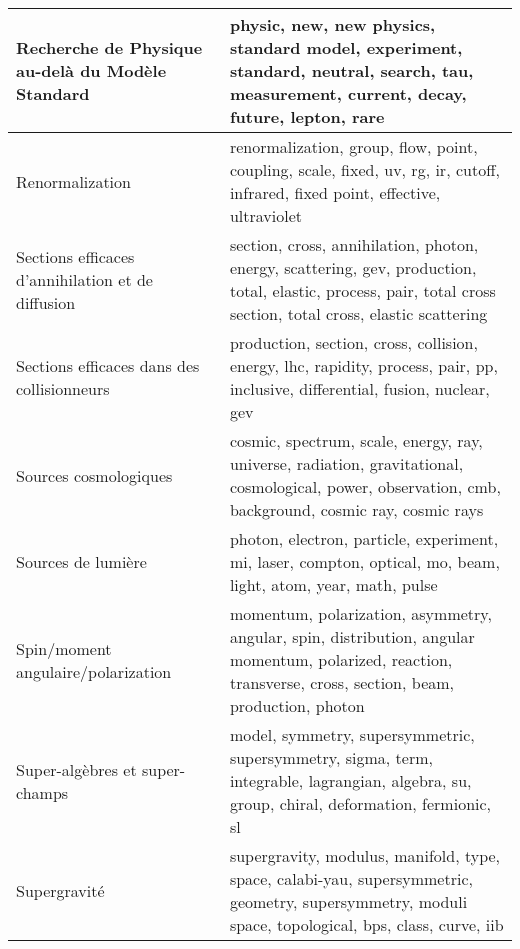 \begin{longtable}[H]{p{}|p{}}
Recherche de Physique au-delà du Modèle Standard                &                                                                    physic, new, new physics, standard model, experiment, standard, neutral, search, tau, measurement, current, decay, future, lepton, rare \\ \midrule
Renormalization                                                 &                                                                             renormalization, group, flow, point, coupling, scale, fixed, uv, rg, ir, cutoff, infrared, fixed point, effective, ultraviolet \\ \midrule
Sections efficaces d'annihilation et de diffusion               &                                             section, cross, annihilation, photon, energy, scattering, gev, production, total, elastic, process, pair, total cross section, total cross, elastic scattering \\ \midrule
Sections efficaces dans des collisionneurs                      &                                                                             production, section, cross, collision, energy, lhc, rapidity, process, pair, pp, inclusive, differential, fusion, nuclear, gev \\ \midrule
Sources cosmologiques                                           &                                                       cosmic, spectrum, scale, energy, ray, universe, radiation, gravitational, cosmological, power, observation, cmb, background, cosmic ray, cosmic rays \\ \midrule
Sources de lumière                                              &                                                                                              photon, electron, particle, experiment, mi, laser, compton, optical, mo, beam, light, atom, year, math, pulse \\ \midrule
Spin/moment angulaire/polarization                              &                                                momentum, polarization, asymmetry, angular, spin, distribution, angular momentum, polarized, reaction, transverse, cross, section, beam, production, photon \\ \midrule
Super-algèbres et super-champs                                  &                                                                model, symmetry, supersymmetric, supersymmetry, sigma, term, integrable, lagrangian, algebra, su, group, chiral, deformation, fermionic, sl \\ \midrule
Supergravité                                                    &                                                       supergravity, modulus, manifold, type, space, calabi-yau, supersymmetric, geometry, supersymmetry, moduli space, topological, bps, class, curve, iib \\ \midrule

\end{longtable}
